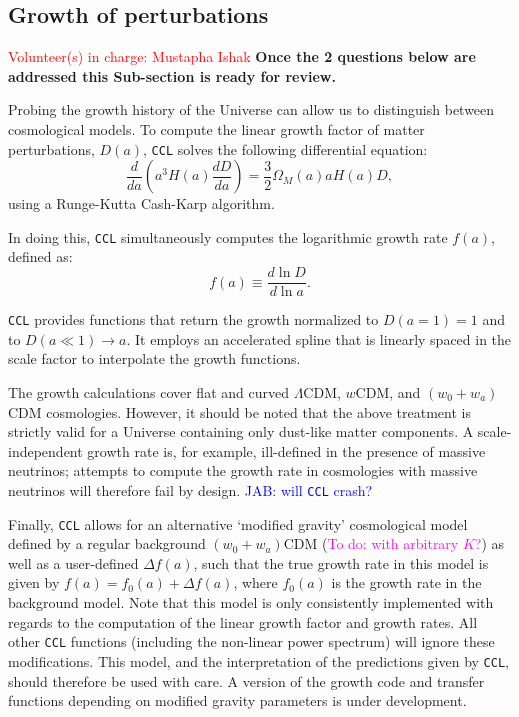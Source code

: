 \documentclass[\docopts]{\docclass}
\newcommand{\todo}[1]{\textcolor{magenta}{To do: #1}}
\newcommand{\vol}[1]{\textcolor{red}{Volunteer(s) in charge: #1}}
\newcommand{\jab}[1]{\textcolor{blue}{JAB: #1}}
\newcommand{\ccl}{{\tt CCL}\xspace}
\begin{document}
\subsection{Growth of perturbations}
\vol{Mustapha Ishak}
\label{sec:growth}
{\textcolor{red!55!blue}{\bf Once the 2 questions below are addressed this Sub-section is ready for review.}}


Probing the growth history of the Universe can allow us to distinguish between cosmological models. 
To compute the linear growth factor of matter perturbations, $D(a)$, \ccl solves the following differential equation:
\begin{equation}
  \frac{d}{da}\left(a^3H(a)\frac{dD}{da}\right)=\frac{3}{2}\Omega_M(a)aH(a)D,
  \label{eq:growth}
\end{equation}
using a Runge-Kutta Cash-Karp algorithm. 

In doing this, \ccl simultaneously computes the logarithmic growth rate $f(a)$, defined as:
\begin{equation}
  f(a)\equiv \frac{d\ln D}{d\ln a}.
\end{equation}

\ccl provides functions that return the growth normalized to $D(a=1)=1$ and to $D(a\ll1)\rightarrow a$. It employs an accelerated spline that is linearly spaced in the scale factor to interpolate the growth functions. 

The growth calculations cover flat and curved $\Lambda$CDM, $w$CDM, and $(w_0 + w_a)$CDM cosmologies. However, it should be noted that the above treatment is strictly valid for a Universe containing only dust-like matter components. A scale-independent growth rate is, for example, ill-defined in the presence of massive neutrinos; attempts to compute the growth rate in cosmologies with massive neutrinos will therefore fail by design. \jab{will \ccl crash?}

Finally, \ccl allows for an alternative `modified gravity' cosmological model defined by a regular background $(w_0+w_a)$CDM (\todo{with arbitrary $K$?}) as well as a user-defined $\Delta f(a)$, such that the true growth rate in this model is given by $f(a)=f_0(a)+\Delta f(a)$, where $f_0(a)$ is the growth rate in the background model. Note that this model is only consistently implemented with regards to the computation of the linear growth factor and growth rates.
All other \ccl functions (including the non-linear power spectrum) will ignore these modifications. This model, and the interpretation of the predictions given by \ccl, should therefore be used with care. A version of the growth code and transfer functions depending on modified gravity parameters is under development. 
\end{document}
